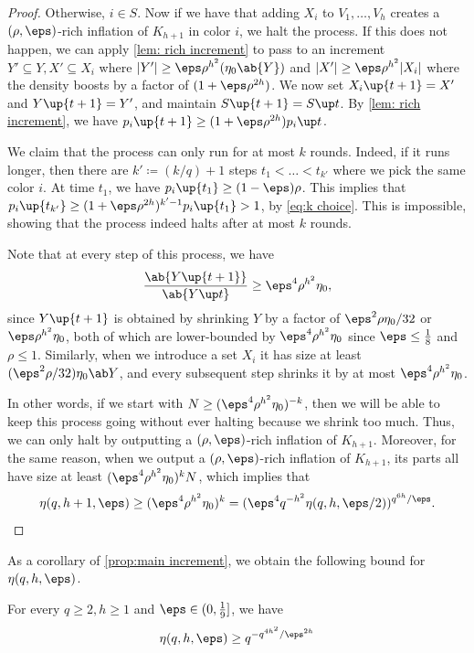 \begin{proof}
Otherwise, $i\in S$. Now if we have that adding $X_i$ to $V_1,\dots,V_{h}$ creates a $(\rho,\eps)$-rich inflation of $K_{h+1}$ in color $i$, we halt the process. If this does not happen, we can apply \cref{lem: rich increment} to pass to an increment $Y'\subseteq Y,X'\subseteq X_i$ where $|Y'|\ge \eps \rho^{h^2}(\eta_0 \ab{Y})$ and $|X'|\ge \eps \rho^{h^2}|X_i|$ where the density boosts by a factor of $(1+\eps\rho^{2h})$. We now set $X_i \up{t+1}=X'$ and $Y\up{t+1} = Y'$, and maintain $S\up{t+1}=S\up t$. By \cref{lem: rich increment}, we have $p_i\up{t+1} \geq (1+\eps \rho^{2h})p_i\up t$.

We claim that the process can only run for at most $k$ rounds. Indeed, if it runs longer, then there are $k'\coloneqq (k/q)+1$ steps $t_1<\dots <t_{k'}$ where we pick the same color $i$. At time $t_1$, we have $p_i\up{t_1}\ge (1-\eps)\rho$. This implies that $p_i\up {t_{k'}} \ge (1+\eps\rho^{2h})^{k'-1}p_i\up {t_1}>1$, by \eqref{eq:k choice}. This is impossible, showing that the process indeed halts after at most $k$ rounds.

Note that at every step of this process, we have
\[
\frac{\ab{Y\up{t+1}}}{\ab{Y\up t}} \geq \eps^4 \rho^{h^2} \eta_0,
\]
since $Y\up {t+1}$ is obtained by shrinking $Y$ by a factor of $\eps^2 \rho\eta_0/32$ or $\eps \rho^{h^2}\eta_0$, both of which are lower-bounded by $\eps^4 \rho^{h^2}\eta_0$ since $\eps \leq \frac 18$ and $\rho \leq 1$. Similarly, when we introduce a set $X_i$ it has size at least $(\eps^2 \rho/32)\eta_0 \ab Y$, and every subsequent step shrinks it by at most $\eps^4 \rho^{h^2} \eta_0$.

In other words, if we start with $N \geq (\eps^4 \rho^{h^2}\eta_0)^{-k}$, then we will be able to keep this process going without ever halting because we shrink too much. Thus, we can only halt by outputting a $(\rho,\eps)$-rich inflation of $K_{h+1}$. Moreover, for the same reason, when we output a $(\rho,\eps)$-rich inflation of $K_{h+1}$, its parts all have size at least $(\eps^4 \rho^{h^2}\eta_0)^k N$, which implies that
\[
\eta(q,h+1,\eps) \geq (\eps^4 \rho^{h^2} \eta_0)^k = (\eps^4 q^{-h^2} \eta(q,h,\eps/2))^{q^{6h}/\eps}.\qedhere
\]
\end{proof}
As a corollary of \cref{prop:main increment}, we obtain the following bound for $\eta(q,h,\eps)$.
\begin{corollary}\label{cor:eta LB}
    For every $q\geq 2,h \geq 1$ and $\eps \in (0,\frac 19]$, we have
    \[
    \eta(q,h,\eps) \geq q^{-q^{4h^2}/\eps^{2h}}
    \]
\end{corollary}
